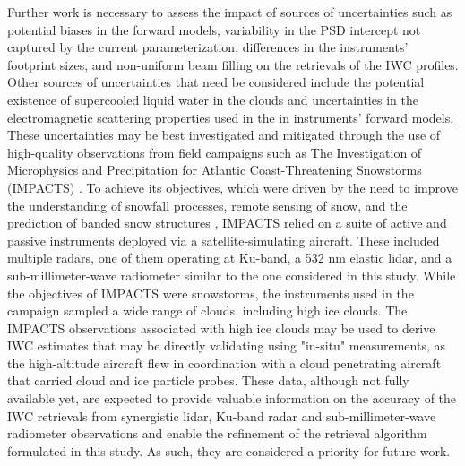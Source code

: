 \documentclass{ametsocV6.1}
\begin{document}
Further work is necessary to assess the impact of sources of uncertainties such as potential biases in the
forward models, variability in the
PSD intercept not captured by the current parameterization, differences in the instruments' footprint sizes,
and non-uniform beam filling on the retrievals of the IWC profiles.  Other sources of uncertainties that
need be considered include the potential existence of supercooled liquid water in the clouds and uncertainties
in the electromagnetic scattering properties used in the in instruments' forward models. These uncertainties
may be best investigated and mitigated through the use of high-quality observations from field campaigns
such as The Investigation of Microphysics and Precipitation for Atlantic Coast-Threatening Snowstorms (IMPACTS)
\citep{mcmurdie2022}. To achieve its objectives, which were driven by the need to improve the understanding of snowfall processes, 
remote sensing of snow, and the prediction of banded snow structures \citep{mcmurdie2022}, IMPACTS relied on a suite 
of active and passive instruments deployed via a satellite-simulating aircraft. These included multiple radars, one of them
operating at Ku-band, a 532 nm elastic lidar, and a sub-millimeter-wave radiometer similar to the one considered in this study.
While the objectives of IMPACTS were snowstorms, the instruments used in the campaign sampled a wide range of clouds, 
including high ice clouds.  The IMPACTS observations associated with high ice clouds may be used to derive IWC estimates that may be
directly validating using "in-situ" measurements, as the high-altitude aircraft flew in coordination with a cloud penetrating
aircraft that carried cloud and ice particle probes. These data, although not fully available yet, are expected to
provide valuable information on the accuracy of the IWC retrievals from synergistic lidar, Ku-band radar and 
sub-millimeter-wave radiometer observations and enable the refinement of the retrieval algorithm formulated in this study.
As such, they are considered a priority for future work.




\end{document}
